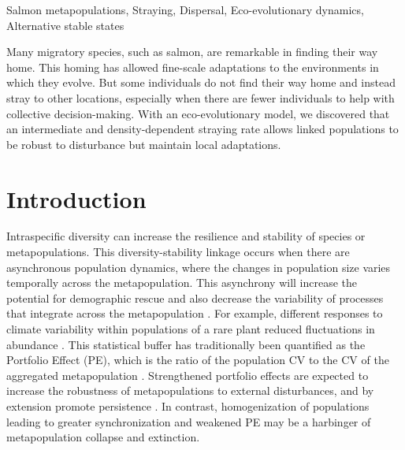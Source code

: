\documentclass{revtex4}
\begin{document}
\maketitle

\centerline{Salmon metapopulations, Straying, Dispersal, Eco-evolutionary dynamics, Alternative stable states}
\vspace{2mm}
Many migratory species, such as salmon, are remarkable in finding their way home. This homing has allowed fine-scale adaptations to the environments in which they evolve. But some individuals do not find their way home and instead stray to other locations, especially when there are fewer individuals to help with collective decision-making. With an eco-evolutionary model, we discovered that an intermediate and density-dependent straying rate allows linked populations to be robust to disturbance but maintain local adaptations.\\


\section{Introduction}

Intraspecific diversity can increase the resilience and stability of species or metapopulations. 
This diversity-stability linkage occurs when there are asynchronous population dynamics, where the changes in population size varies temporally across the metapopulation. 
This asynchrony will increase the potential for demographic rescue \citep{Brown:1977gk,Earn:2000fm} and also decrease the variability of processes that integrate across the metapopulation \citep{Anonymous:2015gf}. 
For example, different responses to climate variability within populations of a rare plant reduced fluctuations in abundance \citep{Abbott:2017hl}. 
This statistical buffer has traditionally been quantified as the Portfolio Effect (PE), which is the ratio of the population CV to the CV of the aggregated metapopulation \citep{Thibaut:2012km}. 
Strengthened portfolio effects are expected to increase the robustness of metapopulations to external disturbances, and by extension promote persistence \citep{Thibaut:2012km}.
In contrast, homogenization of populations leading to greater synchronization and weakened PE may be a harbinger of metapopulation collapse and extinction.
\end{document}
